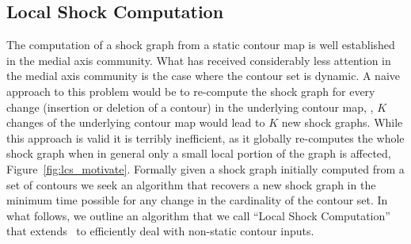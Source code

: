 \begin{appendices}

\section{Local Shock Computation}
\label{sec:lsc}

The computation of a shock graph from a static contour map is well established in the medial axis community.  What has received considerably less attention in the medial axis community is the case where the contour set is dynamic. A naive approach to this problem would be to re-compute the shock graph for every change (insertion or deletion of a contour) in the underlying contour map, \ie, $K$ changes of the underlying contour map would lead to $K$ new shock graphs. While this approach is valid it is terribly inefficient, as it globally re-computes the whole shock graph when in general only a small local portion of the graph is affected, Figure~\ref{fig:lcs_motivate}.  Formally given a shock graph initially computed from a set of contours we seek an algorithm that recovers a new shock graph in the minimum time possible for any change in the cardinality of the contour set. In what follows, we outline an algorithm that we call ``Local Shock Computation'' that extends~\cite{Tamrakar:Kimia:Shock} to efficiently deal with non-static contour inputs. 


\end{appendices}
